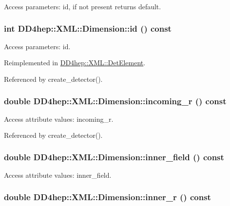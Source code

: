 Access parameters: id, if not present returns default. \hypertarget{struct_d_d4hep_1_1_x_m_l_1_1_dimension_a60d036beca11ef19a6843c24b96151d9}{
\subsubsection[{id}]{\setlength{\rightskip}{0pt plus 5cm}int DD4hep::XML::Dimension::id () const}}
\label{struct_d_d4hep_1_1_x_m_l_1_1_dimension_a60d036beca11ef19a6843c24b96151d9}


Access parameters: id. 

Reimplemented in \hyperlink{struct_d_d4hep_1_1_x_m_l_1_1_det_element_ab792b1e02d95042fd94897283df9f8fa}{DD4hep::XML::DetElement}.

Referenced by create\_\-detector().\hypertarget{struct_d_d4hep_1_1_x_m_l_1_1_dimension_a5ea5150aa6940c9fc5873aa3659c6db7}{
\subsubsection[{incoming\_\-r}]{\setlength{\rightskip}{0pt plus 5cm}double DD4hep::XML::Dimension::incoming\_\-r () const}}
\label{struct_d_d4hep_1_1_x_m_l_1_1_dimension_a5ea5150aa6940c9fc5873aa3659c6db7}


Access attribute values: incoming\_\-r. 

Referenced by create\_\-detector().\hypertarget{struct_d_d4hep_1_1_x_m_l_1_1_dimension_a9cefbb357a8a10ac57d833a776514f39}{
\subsubsection[{inner\_\-field}]{\setlength{\rightskip}{0pt plus 5cm}double DD4hep::XML::Dimension::inner\_\-field () const}}
\label{struct_d_d4hep_1_1_x_m_l_1_1_dimension_a9cefbb357a8a10ac57d833a776514f39}


Access attribute values: inner\_\-field. \hypertarget{struct_d_d4hep_1_1_x_m_l_1_1_dimension_a9e8e55b0f77ab3df95530a376a523a9a}{
\subsubsection[{inner\_\-r}]{\setlength{\rightskip}{0pt plus 5cm}double DD4hep::XML::Dimension::inner\_\-r () const}}
\label{struct_d_d4hep_1_1_x_m_l_1_1_dimension_a9e8e55b0f77ab3df95530a376a523a9a}


